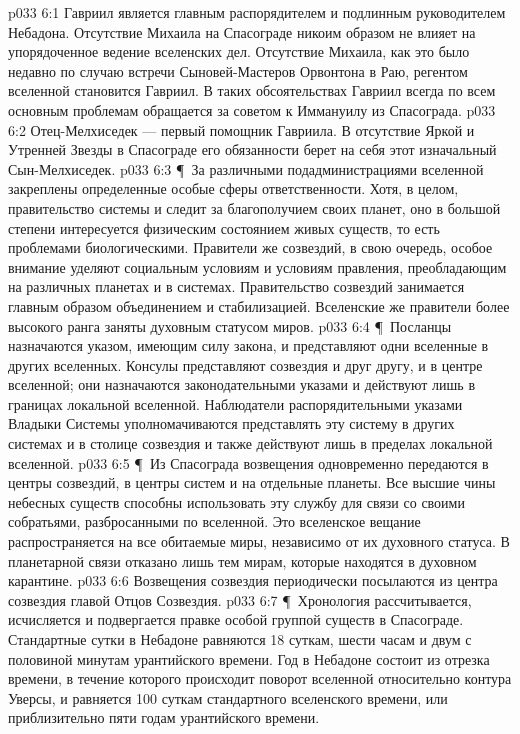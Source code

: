 \vs p033 6:1 Гавриил является главным распорядителем и подлинным руководителем Небадона. Отсутствие Михаила на Спасограде никоим образом не влияет на упорядоченное ведение вселенских дел. Отсутствие Михаила, как это было недавно по случаю встречи Сыновей\hyp{}Мастеров Орвонтона в Раю, регентом вселенной становится Гавриил. В таких обсоятельствах Гавриил всегда по всем основным проблемам обращается за советом к Иммануилу из Спасограда.
\vs p033 6:2 Отец\hyp{}Мелхиседек --- первый помощник Гавриила. В отсутствие Яркой и Утренней Звезды в Спасограде его обязанности берет на себя этот изначальный Сын\hyp{}Мелхиседек.
\vs p033 6:3 \P\ За различными подадминистрациями вселенной закреплены определенные особые сферы ответственности. Хотя, в целом, правительство системы и следит за благополучием своих планет, оно в большой степени интересуется физическим состоянием живых существ, то есть проблемами биологическими. Правители же созвездий, в свою очередь, особое внимание уделяют социальным условиям и условиям правления, преобладающим на различных планетах и в системах. Правительство созвездий занимается главным образом объединением и стабилизацией. Вселенские же правители более высокого ранга заняты духовным статусом миров.
\vs p033 6:4 \P\ Посланцы назначаются указом, имеющим силу закона, и представляют одни вселенные в других вселенных. Консулы представляют созвездия и друг другу, и в центре вселенной; они назначаются законодательными указами и действуют лишь в границах локальной вселенной. Наблюдатели распорядительными указами Владыки Системы уполномачиваются представлять эту систему в других системах и в столице созвездия и также действуют лишь в пределах локальной вселенной.
\vs p033 6:5 \P\ Из Спасограда возвещения одновременно передаются в центры созвездий, в центры систем и на отдельные планеты. Все высшие чины небесных существ способны использовать эту службу для связи со своими собратьями, разбросанными по вселенной. Это вселенское вещание распространяется на все обитаемые миры, независимо от их духовного статуса. В планетарной связи отказано лишь тем мирам, которые находятся в духовном карантине.
\vs p033 6:6 Возвещения созвездия периодически посылаются из центра созвездия главой Отцов Созвездия.
\vs p033 6:7 \P\ Хронология рассчитывается, исчисляется и подвергается правке особой группой существ в Спасограде. Стандартные сутки в Небадоне равняются 18 суткам, шести часам и двум с половиной минутам урантийского времени. Год в Небадоне состоит из отрезка времени, в течение которого происходит поворот вселенной относительно контура Уверсы, и равняется 100 суткам стандартного вселенского времени, или приблизительно пяти годам урантийского времени.
